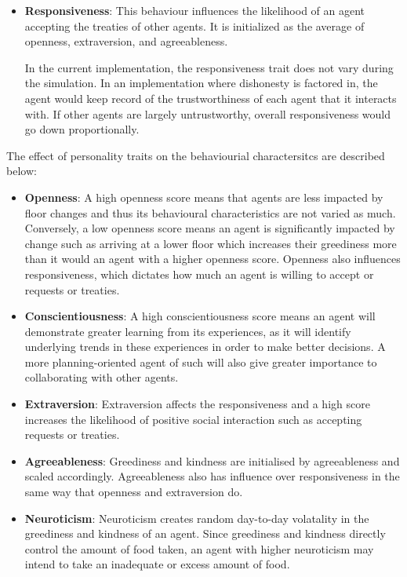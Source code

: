 \begin{itemize}
    \item  \textbf{Responsiveness}: 
    This behaviour influences the likelihood of an agent accepting the treaties of other agents. It is initialized as the average of openness, extraversion, and agreeableness. 
    
    In the current implementation, the responsiveness trait does not vary during the simulation. In an implementation where dishonesty is factored in, the agent would keep record of the trustworthiness of each agent that it interacts with. If other agents are largely untrustworthy, overall responsiveness would go down proportionally. 
    
\end{itemize}

The effect of personality traits on the behaviourial charactersitcs are described below:
\begin{itemize}
    \item  \textbf{Openness}: A high openness score means that agents are less impacted by floor changes and thus its behavioural characteristics are not varied as much. Conversely, a low openness score means an agent is significantly impacted by change such as arriving at a lower floor which increases their greediness more than it would an agent with a higher openness score. Openness also influences responsiveness, which dictates how much an agent is willing to accept or requests or treaties.
    
    \item  \textbf{Conscientiousness}: A high conscientiousness score means an agent will demonstrate greater learning from its experiences, as it will identify underlying trends in these experiences in order to make better decisions. A more planning-oriented agent of such will also give greater importance to collaborating with other agents.
    
    \item  \textbf{Extraversion}: Extraversion affects the responsiveness and a high score increases the likelihood of positive social interaction such as accepting requests or treaties. 
    
    \item  \textbf{Agreeableness}: Greediness and kindness are initialised by agreeableness and scaled accordingly. Agreeableness also has influence over responsiveness in the same way that openness and extraversion do.
    
    \item  \textbf{Neuroticism}: Neuroticism creates random day-to-day volatality in the greediness and kindness of an agent. Since greediness and kindness directly control the amount of food taken, an agent with higher neuroticism may intend to take an inadequate or excess amount of food.
\end{itemize}


